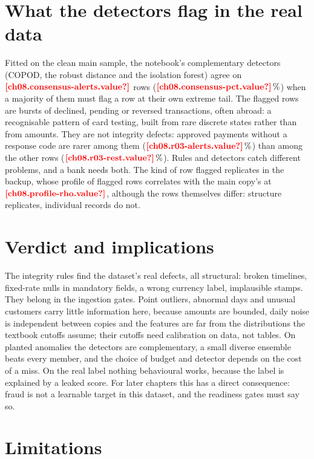 \section{What the detectors flag in the real data}\label{sec:ad-consensus}

Fitted on the clean main sample, the notebook's complementary detectors (COPOD, the robust distance and the
isolation forest) agree on $\est{ch08.consensus-alerts}{value}$
rows ($\est{ch08.consensus-pct}{value}\,\%$) when a majority of them must flag a row at their own extreme tail. The
flagged rows are bursts of declined, pending or reversed transactions, often abroad: a recognisable pattern of card
testing, built from rare discrete states rather than from amounts. They are not integrity defects: approved payments
without a response code are rarer among them ($\est{ch08.r03-alerts}{value}\,\%$) than among the other rows
($\est{ch08.r03-rest}{value}\,\%$). Rules and detectors catch different problems, and a bank needs both. The kind of row
flagged replicates in the backup, whose profile of flagged rows correlates with the main copy's at
$\est{ch08.profile-rho}{value}$, although the rows themselves differ: structure replicates, individual records do not.

\section{Verdict and implications}\label{sec:ad-verdict}

The integrity rules find the dataset's real defects, all structural: broken timelines, fixed-rate nulls in mandatory
fields, a wrong currency label, implausible stamps. They belong in the ingestion gates. Point outliers, abnormal days and
unusual customers carry little information here, because amounts are bounded, daily noise is independent between copies
and the features are far from the distributions the textbook cutoffs assume; their cutoffs need calibration on data,
not tables. On planted anomalies the detectors are complementary, a small diverse ensemble beats every member, and the
choice of budget and detector depends on the cost of a miss. On the real label nothing behavioural works, because the
label is explained by a leaked score. For later chapters this has a direct consequence: fraud is not a learnable target
in this dataset, and the readiness gates must say so.

\section{Limitations}\label{sec:ad-limits}

